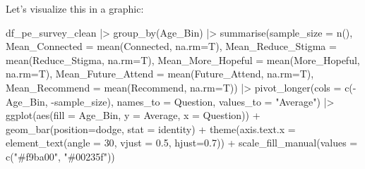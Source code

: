 \documentclass[
  letterpaper,
  DIV=11,
  numbers=noendperiod]{scrartcl}
\newenvironment{Shaded}{\begin{snugshade}}{\end{snugshade}}
\newcommand{\AttributeTok}[1]{\textcolor[rgb]{0.40,0.45,0.13}{#1}}
\newcommand{\DecValTok}[1]{\textcolor[rgb]{0.68,0.00,0.00}{#1}}
\newcommand{\FloatTok}[1]{\textcolor[rgb]{0.68,0.00,0.00}{#1}}
\newcommand{\FunctionTok}[1]{\textcolor[rgb]{0.28,0.35,0.67}{#1}}
\newcommand{\NormalTok}[1]{\textcolor[rgb]{0.00,0.23,0.31}{#1}}
\newcommand{\SpecialCharTok}[1]{\textcolor[rgb]{0.37,0.37,0.37}{#1}}
\newcommand{\StringTok}[1]{\textcolor[rgb]{0.13,0.47,0.30}{#1}}
\begin{document}
Let's visualize this in a graphic:

\begin{Shaded}
\begin{Highlighting}[]
\NormalTok{df\_pe\_survey\_clean }\SpecialCharTok{|\textgreater{}} 
  \FunctionTok{group\_by}\NormalTok{(Age\_Bin) }\SpecialCharTok{|\textgreater{}} 
  \FunctionTok{summarise}\NormalTok{(}\AttributeTok{sample\_size =} \FunctionTok{n}\NormalTok{(),}
            \AttributeTok{Mean\_Connected =} \FunctionTok{mean}\NormalTok{(Connected, }\AttributeTok{na.rm=}\NormalTok{T),}
            \AttributeTok{Mean\_Reduce\_Stigma =} \FunctionTok{mean}\NormalTok{(Reduce\_Stigma, }\AttributeTok{na.rm=}\NormalTok{T),}
            \AttributeTok{Mean\_More\_Hopeful =} \FunctionTok{mean}\NormalTok{(More\_Hopeful, }\AttributeTok{na.rm=}\NormalTok{T),}
            \AttributeTok{Mean\_Future\_Attend =} \FunctionTok{mean}\NormalTok{(Future\_Attend, }\AttributeTok{na.rm=}\NormalTok{T),}
            \AttributeTok{Mean\_Recommend =} \FunctionTok{mean}\NormalTok{(Recommend, }\AttributeTok{na.rm=}\NormalTok{T)) }\SpecialCharTok{|\textgreater{}} 
  \FunctionTok{pivot\_longer}\NormalTok{(}\AttributeTok{cols =} \FunctionTok{c}\NormalTok{(}\SpecialCharTok{{-}}\NormalTok{Age\_Bin, }\SpecialCharTok{{-}}\NormalTok{sample\_size),}
               \AttributeTok{names\_to =} \StringTok{\textquotesingle{}Question\textquotesingle{}}\NormalTok{,}
               \AttributeTok{values\_to =} \StringTok{"Average"}\NormalTok{) }\SpecialCharTok{|\textgreater{}} 
  \FunctionTok{ggplot}\NormalTok{(}\FunctionTok{aes}\NormalTok{(}\AttributeTok{fill =}\NormalTok{ Age\_Bin, }\AttributeTok{y =}\NormalTok{ Average, }\AttributeTok{x =}\NormalTok{ Question)) }\SpecialCharTok{+}
  \FunctionTok{geom\_bar}\NormalTok{(}\AttributeTok{position=}\StringTok{\textquotesingle{}dodge\textquotesingle{}}\NormalTok{, }\AttributeTok{stat =} \StringTok{\textquotesingle{}identity\textquotesingle{}}\NormalTok{) }\SpecialCharTok{+}
  \FunctionTok{theme}\NormalTok{(}\AttributeTok{axis.text.x =} \FunctionTok{element\_text}\NormalTok{(}\AttributeTok{angle =} \DecValTok{30}\NormalTok{, }\AttributeTok{vjust =} \FloatTok{0.5}\NormalTok{, }\AttributeTok{hjust=}\FloatTok{0.7}\NormalTok{)) }\SpecialCharTok{+}
  \FunctionTok{scale\_fill\_manual}\NormalTok{(}\AttributeTok{values =} \FunctionTok{c}\NormalTok{(}\StringTok{"\#f9ba00"}\NormalTok{,}
                               \StringTok{"\#00235f"}\NormalTok{))}
\end{Highlighting}
\end{Shaded}
\end{document}
